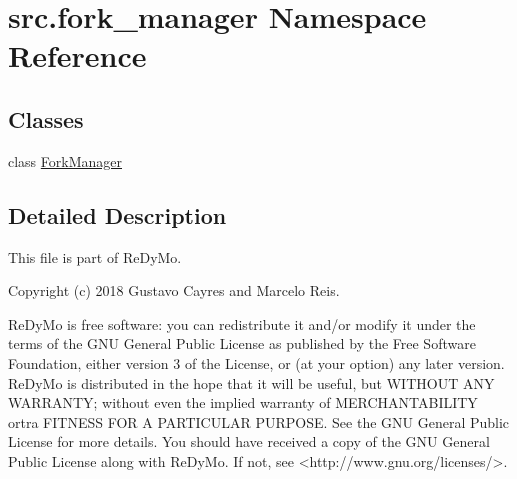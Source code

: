 \hypertarget{namespacesrc_1_1fork__manager}{}\section{src.\+fork\+\_\+manager Namespace Reference}
\label{namespacesrc_1_1fork__manager}
\subsection*{Classes}
\begin{DoxyCompactItemize}
\item 
class \mbox{\hyperlink{classsrc_1_1fork__manager_1_1ForkManager}{Fork\+Manager}}
\end{DoxyCompactItemize}


\subsection{Detailed Description}
\begin{DoxyVerb}This file is part of ReDyMo.

Copyright (c) 2018  Gustavo Cayres and Marcelo Reis.

ReDyMo is free software: you can redistribute it and/or modify it
under the terms of the GNU General Public License as published by the
Free Software Foundation, either version 3 of the License, or (at your
option) any later version.
ReDyMo is distributed in the hope that it will be useful, but WITHOUT
ANY WARRANTY; without even the implied warranty of MERCHANTABILITY ortra
FITNESS FOR A PARTICULAR PURPOSE. See the GNU General Public License
for more details.
You should have received a copy of the GNU General Public License along
with ReDyMo. If not, see <http://www.gnu.org/licenses/>.\end{DoxyVerb}
 